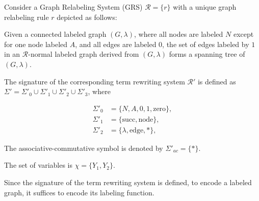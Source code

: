     \begin{example}
        \label{example_grs_to_trs}
        
        Consider a Graph Relabeling System (GRS) \(\mathcal{R} = \{r\}\) with a unique graph relabeling rule \(r\) depicted as follows:
    
        
        Given a connected labeled graph \((G, \lambda)\), where all nodes are labeled \(N\) except for one node labeled \(A\), and all edges are labeled \(0\), the set of edges labeled by \(1\) in an \(\mathcal{R}\)-normal labeled graph derived from \((G, \lambda)\) forms a spanning tree of \((G, \lambda)\).
        
        The signature of the corresponding term rewriting system \(\mathcal{R}'\) is defined as \(\Sigma' = \Sigma'_0 \cup \Sigma'_1 \cup \Sigma'_2 \cup \Sigma'_3\), where

        \begin{align*}
            \Sigma'_0 &= \{ N, A, 0, 1, \text{zero} \}, \\
            \Sigma'_1 &= \{ \text{succ}, \text{node} \}, \\
            \Sigma'_2 &= \{ \lambda, \text{edge}, * \},
        \end{align*}
        
        The associative-commutative symbol is denoted by \(\Sigma'_{ac} = \{ * \}\).
    
        The set of variables is \(\chi = \{ Y_1, Y_2 \}\).
        
    \end{example}    

    Since the signature of the term rewriting system is defined, to encode a labeled graph, it suffices to encode its labeling function.

